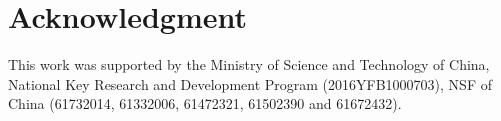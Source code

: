 \section*{Acknowledgment}
\vspace{-1pt}
This work was supported by the Ministry of Science and Technology of China, National Key Research and Development Program (2016YFB1000703), NSF of China (61732014, 61332006, 61472321, 61502390 and 61672432).
